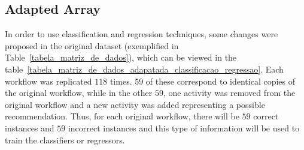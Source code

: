 \documentclass{doublecol-new}
\theoremstyle{TH}{
\newtheorem{lemma}{Lemma}
\newtheorem{theorem}[lemma]{Theorem}
\newtheorem{corrolary}[lemma]{Corrolary}
\newtheorem{conjecture}[lemma]{Conjecture}
\newtheorem{proposition}[lemma]{Proposition}
\newtheorem{claim}[lemma]{Claim}
\newtheorem{stheorem}[lemma]{Wrong Theorem}
\newtheorem{algorithm}{Algorithm}
}
\theoremstyle{THrm}{
\newtheorem{definition}{Definition}[section]
\newtheorem{question}{Question}[section]
\newtheorem{remark}{Remark}
\newtheorem{scheme}{Scheme}
}
\theoremstyle{THhit}{
\newtheorem{case}{Case}[section]
}
\begin{document}
\subsection*{Adapted Array}
In order to use classification and regression techniques, some changes were proposed in the original dataset (exemplified in Table~\ref{tabela_matriz_de_dados}), which can be viewed in the table~\ref{tabela_matriz_de_dados_adapatada_classificacao_regressao}. Each workflow was replicated \(118\) times. 59 of these correspond to identical copies of the original workflow, while in the other \(59\), one activity was removed from the original workflow and a new activity was added representing a possible recommendation. Thus, for each original workflow, there will be \(59\) correct instances and \(59\) incorrect instances and this type of information will be used to train the classifiers or regressors.
\end{document}
